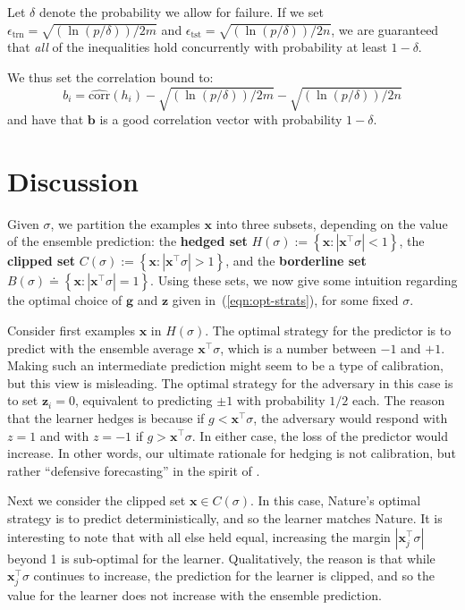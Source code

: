\documentclass{colt2015} %
\newcommand{\corr}{\mbox{corr}}
\newcommand{\vx}{\mathbf{x}}
\newcommand{\vb}{\mathbf{b}}
\newcommand{\vg}{\mathbf{g}}
\newcommand{\vz}{\mathbf{z}}
\newcommand{\abs}[1]{\left| #1 \right|}
\begin{document}
Let $\delta$ denote the probability we allow for failure. If we set 
$\epsilon_{\mbox{trn}}=\sqrt{(\ln(p/\delta))/2m}$ and
$\epsilon_{\mbox{tst}}=\sqrt{(\ln(p/\delta))/2n}$, we are guaranteed that {\em
  all} of the inequalities hold concurrently with probability at
least $1-\delta$.

We thus set the correlation bound to:
\[
b_i=\widehat{\corr}(h_i)-\sqrt{(\ln(p/\delta))/2m}-\sqrt{(\ln(p/\delta))/2n}
\]
and have that $\vb$ is a good correlation vector with probability $1-\delta$.



\section{Discussion}
\label{sec:discthmpred}

Given $\sigma$, we partition the examples $\vx$ into three subsets, depending on the value of the ensemble prediction: 
the {\bf hedged set} $ H (\sigma) := \left\{ \vx :  |\vx^\top \sigma|<1 \right\} $, 
the {\bf clipped set} $C (\sigma) := \left\{ \vx :  |\vx^\top \sigma|>1 \right\} $, 
and the {\bf borderline set} $B (\sigma) \doteq \left\{ \vx :  |\vx^\top \sigma|=1 \right\} $.
Using these sets, we now give some intuition regarding the optimal
choice of $\vg$ and $\vz$ given in~(\ref{eqn:opt-strats}), for some fixed $\sigma$.

Consider first examples $\vx$ in $H(\sigma)$. The optimal strategy for the predictor is
to predict with the ensemble average $\vx^\top \sigma$, which is
a number between $-1$ and $+1$. Making such an intermediate prediction
might seem to be a type of calibration, but this view is misleading. The
optimal strategy for the adversary in this case is to set $\vz_i=0$, 
equivalent to predicting $\pm 1$ with probability $1/2$ each. 
The reason that the learner hedges is because if $g < \vx^\top \sigma$, 
the adversary would respond with $z=1$
and with $z=-1$ if $g > \vx^\top \sigma$. 
In either case, the loss of the predictor would increase. 
In other words, our ultimate rationale for hedging is not calibration, 
but rather ``defensive forecasting'' in the spirit of \cite{VTS05}.

Next we consider the clipped set $\vx \in C(\sigma)$. In this case, Nature's optimal strategy
is to predict deterministically, and so the learner matches Nature. It
is interesting to note that with all else held equal, increasing the margin 
$\abs{\vx_j^\top \sigma}$ beyond 1 is sub-optimal for the learner. 
Qualitatively, the reason is that while $\vx_j^\top \sigma$
continues to increase, the prediction for the learner is clipped, 
and so the value for the learner does not increase with the ensemble prediction.
\end{document}

